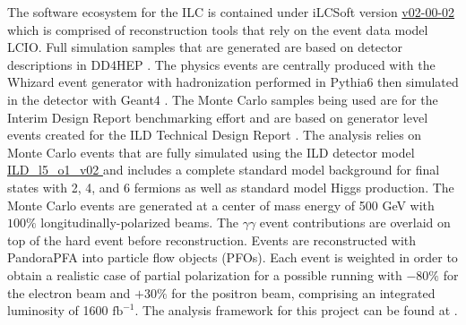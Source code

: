 



The software ecosystem for the ILC is contained under iLCSoft \cite{ilcsoft} version \url{v02-00-02} which is comprised of reconstruction tools that rely on the event data model LCIO\cite{lcio}. Full simulation samples that are generated are based on detector descriptions in DD4HEP \cite{dd4hep}. The physics events are centrally produced with the Whizard event generator \cite{ whizard} with hadronization performed in Pythia6 \cite{pythia6} then simulated in the detector with Geant4 \cite{geant4}. The Monte Carlo samples being used are for the Interim Design Report benchmarking effort \cite{ILDIDR} and are based on generator level events created for the ILD Technical Design Report \cite{tdrdet}. The analysis relies on Monte Carlo events that are fully simulated using the ILD detector model \url{ ILD_l5_o1_v02 } and includes a complete standard model background for final states with 2, 4, and 6 fermions as well as standard model Higgs production.  The Monte Carlo events are generated at a center of mass energy of 500 GeV with $100\%$  longitudinally-polarized beams. The $\gamma \gamma$ event contributions are overlaid on top of the hard event before reconstruction. Events are reconstructed with PandoraPFA \cite{particleflowA} into particle flow objects (PFOs). Each event is weighted in order to obtain a realistic case of partial polarization for a possible running with $-80\%$ for the electron beam and $+30\%$ for the positron beam, comprising an integrated luminosity of 1600 $\text{fb}^{-1}$.  The analysis framework for this project can be found at \cite{wwrepo}. 


